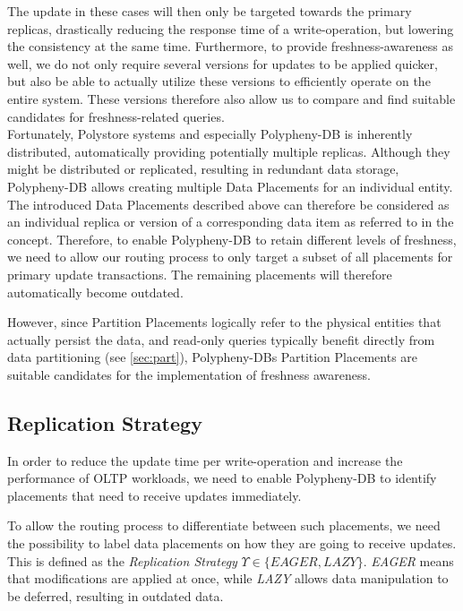 The update in these cases will then only be targeted towards the primary replicas, drastically reducing the response time of a write-operation,
but lowering the consistency at the same time. 
Furthermore, to provide freshness-awareness as well, we do not only require several versions for updates to be applied quicker,
but also be able to actually utilize these versions to efficiently operate on the entire system.
These versions therefore also allow us to compare and find suitable candidates for freshness-related queries.\\
Fortunately, Polystore systems and especially Polypheny-DB is inherently distributed, automatically providing potentially multiple replicas.
Although they might be distributed or replicated, resulting in redundant data storage, Polypheny-DB allows creating multiple Data Placements for an individual entity.
The introduced Data Placements described above can therefore be considered as an individual replica or version of a corresponding data item as referred to in the concept.
Therefore, to enable Polypheny-DB to retain different levels of freshness, we need to allow our routing process
to only target a subset of all placements for primary update transactions. The remaining placements will therefore automatically become outdated. 

However, since Partition Placements logically refer to the physical entities that actually persist the data, and 
read-only queries typically benefit directly from data partitioning (see \ref{sec:part}), Polypheny-DBs Partition Placements 
are suitable candidates for the implementation of freshness awareness.





\subsection{Replication Strategy}
\label{sec:strategy}

In order to reduce the update time per write-operation and increase the performance
of OLTP workloads, we need to enable Polypheny-DB to identify placements that need to receive updates immediately. 

To allow the routing process to differentiate between such placements,
we need the possibility to label data placements on how they are going to receive updates. This is defined as the \emph{Replication Strategy} $\Upsilon \in \{EAGER,LAZY\}$.
\emph{EAGER} means that modifications are applied at once, while \emph{LAZY}
allows data manipulation to be deferred, resulting in outdated data.


